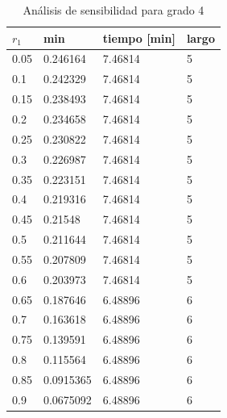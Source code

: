 \documentclass[letter, 10pt]{article}
\begin{document}
\begin{table}[H]
\centering
\begin{tabular}{|l|l|l|l|}
\hline
$r_1$ & min & tiempo {[}min{]} & largo \\ \hline
0.05 & 0.246164 & 7.46814 & 5 \\ \hline
0.1 & 0.242329 & 7.46814 & 5 \\ \hline
0.15 & 0.238493 & 7.46814 & 5 \\ \hline
0.2 & 0.234658 & 7.46814 & 5 \\ \hline
0.25 & 0.230822 & 7.46814 & 5 \\ \hline
0.3 & 0.226987 & 7.46814 & 5 \\ \hline
0.35 & 0.223151 & 7.46814 & 5 \\ \hline
0.4 & 0.219316 & 7.46814 & 5 \\ \hline
0.45 & 0.21548 & 7.46814 & 5 \\ \hline
0.5 & 0.211644 & 7.46814 & 5 \\ \hline
0.55 & 0.207809 & 7.46814 & 5 \\ \hline
0.6 & 0.203973 & 7.46814 & 5 \\ \hline
0.65 & 0.187646 & 6.48896 & 6 \\ \hline
0.7 & 0.163618 & 6.48896 & 6 \\ \hline
0.75 & 0.139591 & 6.48896 & 6 \\ \hline
0.8 & 0.115564 & 6.48896 & 6 \\ \hline
0.85 & 0.0915365 & 6.48896 & 6 \\ \hline
0.9 & 0.0675092 & 6.48896 & 6 \\ \hline
\end{tabular}
\caption{Análisis de sensibilidad para grado 4}
\label{ses-4}
\end{table}
\end{document}
